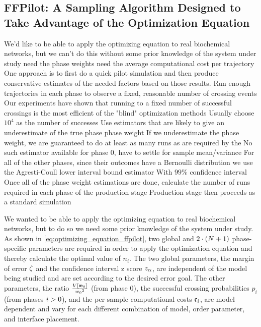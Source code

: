 \subsection{FFPilot: A Sampling Algorithm Designed to Take Advantage of the Optimization Equation}
\label{sec:ffpilot_definition}
\begin{odone}
    \1 We'd like to be able to apply the optimizing equation to real biochemical networks, but we can't do this without some prior knowledge of the system under study
        \2 need the phase weights
        \2 need the average computational cost per trajectory
    \1 One approach is to first do a quick pilot simulation and then produce conservative estimates of the needed factors based on those results.
        \2 Run enough trajectories in each phase to observe a fixed, reasonable number of crossing events
            \3 Our experiments have shown that running to a fixed number of successful crossings is the most efficient of the "blind" optimization methods
            \3 Usually choose $10^4$ as the number of successes
        \2 Use estimators that are likely to give an underestimate of the true phase phase weight
            \3 If we underestimate the phase weight, we are guaranteed to do at least as many runs as are required by the \opteq{}
            \3 No such estimator available for phase 0, have to settle for sample mean/variance
            \3 For all of the other phases, since their outcomes have a Bernoulli distribution we use the Agresti-Coull lower interval bound estimator
                \4 With $99\%$ confidence interval
    \1 Once all of the phase weight estimations are done, calculate the number of runs required in each phase of the production stage
        \2 Production stage then proceeds as a standard  simulation
\end{odone}
We wanted to be able to apply the optimizing equation to real biochemical networks, but to do so we need some prior knowledge of the system under study. As shown in \eqref{eq:optimizing_equation_ffpilot}, two global and $2 \cdot (N + 1)$ phase-specific parameters are required in order to apply the optimization equation and thereby calculate the optimal value of $n_i$. The two global parameters, the margin of error $\zeta$ and the confidence interval z score $z_{\alpha}$, are independent of the model being studied and are set according to the desired error goal. The other parameters, the ratio $\frac{V \left[ \mathfrak{w}_{0} \right]}{w_{0} {}^2}$ (from phase 0), the successful crossing probabilities $p_i$ (from phases $i>0$), and the per-sample computational costs $\mathfrak{c}_{i}$, are model dependent and vary for each different combination of model, order parameter, and interface placement.

